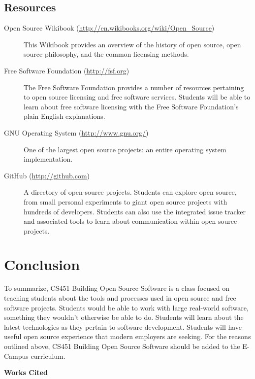 \documentclass[12pt,letterpaper]{article}
\newenvironment{workscited}{\newpage\begin{center} \Large\bfseries Works Cited \end{center} \doublespacing}{\newpage}
\begin{document}
\subsection{Resources}
\begin{description}
  \item[Open Source Wikibook (\url{http://en.wikibooks.org/wiki/Open_Source})]
    This Wikibook provides an overview of the history of open source, open
    source philosophy, and the common licensing methods.
  \item[Free Software Foundation (\url{http://fsf.org})] The Free Software
    Foundation provides a number of resources pertaining to open source
    licensing and free software services.  Students will be able to learn about
    free software licensing with the Free Software Foundation's plain English
    explanations.
  \item[GNU Operating System (\url{http://www.gnu.org/})] One of the largest
    open source projects: an entire operating system implementation.
  \item[GitHub (\url{http://github.com})] A directory of open-source projects.
    Students can explore open source, from small personal experiments to giant
    open source projects with hundreds of developers.  Students can also use the
    integrated issue tracker and associated tools to learn about communication
    within open source projects.
\end{description}

\section{Conclusion}
To summarize, CS451 Building Open Source Software is a class focused on teaching
students about the tools and processes used in open source and free software
projects.  Students would be able to work with large real-world software,
something they wouldn't otherwise be able to do.  Students will learn about the
latest technologies as they pertain to software development.  Students will have
useful open source experience that modern employers are seeking.  For the
reasons outlined above, CS451 Building Open Source Software should be added to
the E-Campus curriculum.

\begin{workscited}




\end{workscited}
\end{document}
